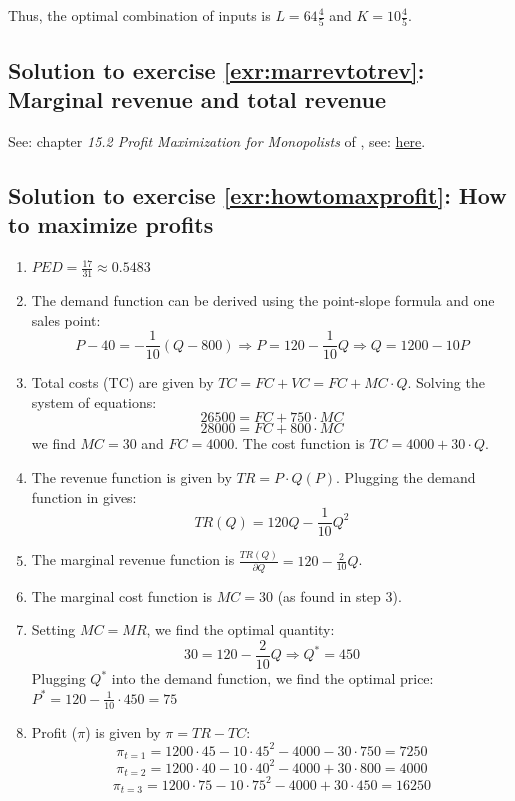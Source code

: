 \documentclass[
  12pt,
  oneside]{book}
\providecommand{\tightlist}{%
  \setlength{\itemsep}{0pt}\setlength{\parskip}{0pt}}
\theoremstyle{definition}
\theoremstyle{definition}
\theoremstyle{definition}
\theoremstyle{definition}
\theoremstyle{remark}
\begin{document}
Thus, the optimal combination of inputs is \(L = 64\frac{4}{5}\) and \(K = 10\frac{4}{5}\).

\hypertarget{sol:marrevtotrev}{%
\subsection*{Solution to exercise \ref{exr:marrevtotrev}: Marginal revenue and total revenue}\label{sol:marrevtotrev}}

See: chapter \emph{15.2 Profit Maximization for Monopolists} of \citet{Emerson2020Intermediate}, see: \href{https://open.oregonstate.education/intermediatemicroeconomics/}{here}.

\hypertarget{sol:howtomaxprofit}{%
\subsection*{Solution to exercise \ref{exr:howtomaxprofit}: How to maximize profits}\label{sol:howtomaxprofit}}

\begin{enumerate}
\def\labelenumi{\arabic{enumi}.}
\tightlist
\item
  \(PED=\frac{17}{31} \approx 0.5483\)
\item
  The demand function can be derived using the point-slope formula and one sales point:
  \[P-40=-\frac{1}{10}(Q-800) \Rightarrow P=120-\frac{1}{10}Q \Rightarrow Q=1200-10P\]
\item
  Total costs (TC) are given by \(TC=FC+VC=FC+MC \cdot Q\). Solving the system of equations:
  \[26500=FC+750 \cdot MC\]
  \[28000=FC+800 \cdot MC\]
  we find \(MC=30\) and \(FC=4000\). The cost function is \(TC=4000+30 \cdot Q\).
\item
  The revenue function is given by \(TR=P \cdot Q(P)\). Plugging the demand function in gives:
  \[TR(Q)=120Q-\frac{1}{10}Q^2\]
\item
  The marginal revenue function is \(\frac{TR(Q)}{\partial Q}=120-\frac{2}{10}Q\).
\item
  The marginal cost function is \(MC=30\) (as found in step 3).
\item
  Setting \(MC=MR\), we find the optimal quantity:
  \[30=120-\frac{2}{10}Q \Rightarrow Q^*=450\]
  Plugging \(Q^*\) into the demand function, we find the optimal price:
  \(P^*=120-\frac{1}{10} \cdot 450 = 75\)
\item
  Profit (\(\pi\)) is given by \(\pi=TR-TC\):
  \[\pi_{t=1}=1200 \cdot 45-10 \cdot 45^2-4000-30 \cdot 750 = 7250\]
  \[\pi_{t=2}=1200 \cdot 40-10 \cdot 40^2-4000+30 \cdot 800 = 4000\]
  \[\pi_{t=3}=1200 \cdot 75-10 \cdot 75^2-4000+30 \cdot 450 = 16250\]
\end{enumerate}
\end{document}
